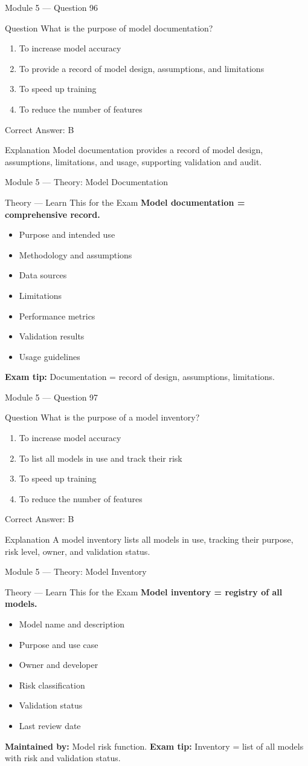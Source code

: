 \documentclass[aspectratio=169,10pt]{beamer}
\newcommand{\question}[1]{%
	\begin{block}{Question}
		#1
	\end{block}
}
\newcommand{\options}[4]{%
	\begin{enumerate}[label=\Alph*.,leftmargin=*]
		\item #1
		\item #2
		\item #3
		\item #4
	\end{enumerate}
}
\newcommand{\answerbox}[1]{%
	\begin{exampleblock}{Correct Answer: #1}
	\end{exampleblock}
}
\newcommand{\explain}[1]{%
	\begin{block}{Explanation}
		\small #1
	\end{block}
}
\newcommand{\theory}[1]{%
	\begin{block}{Theory --- Learn This for the Exam}
		\small #1
	\end{block}
}
\begin{document}
	\begin{frame}{Module 5 --- Question 96}
		\question{What is the purpose of model documentation?}
		\options{To increase model accuracy}{To provide a record of model design, assumptions, and limitations}{To speed up training}{To reduce the number of features}
		\answerbox{B}
		\explain{Model documentation provides a record of model design, assumptions, limitations, and usage, supporting validation and audit.}
	\end{frame}
	
	\begin{frame}{Module 5 --- Theory: Model Documentation}
		\theory{
			\textbf{Model documentation = comprehensive record.}
			\begin{itemize}
				\item Purpose and intended use
				\item Methodology and assumptions
				\item Data sources
				\item Limitations
				\item Performance metrics
				\item Validation results
				\item Usage guidelines
			\end{itemize}
			\textbf{Exam tip:} Documentation = record of design, assumptions, limitations.
		}
	\end{frame}
	
	\begin{frame}{Module 5 --- Question 97}
		\question{What is the purpose of a model inventory?}
		\options{To increase model accuracy}{To list all models in use and track their risk}{To speed up training}{To reduce the number of features}
		\answerbox{B}
		\explain{A model inventory lists all models in use, tracking their purpose, risk level, owner, and validation status.}
	\end{frame}
	
	\begin{frame}{Module 5 --- Theory: Model Inventory}
		\theory{
			\textbf{Model inventory = registry of all models.}
			\begin{itemize}
				\item Model name and description
				\item Purpose and use case
				\item Owner and developer
				\item Risk classification
				\item Validation status
				\item Last review date
			\end{itemize}
			\textbf{Maintained by:} Model risk function.
			\textbf{Exam tip:} Inventory = list of all models with risk and validation status.
		}
	\end{frame}
	
\end{document}
